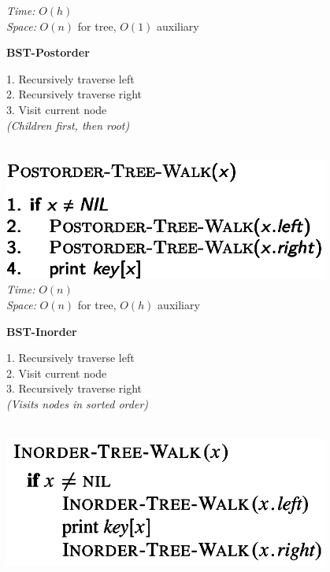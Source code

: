 {\begin{minipage}[t]{1\textwidth}
\begin{minipage}[t]{0.19\textwidth}
        \textit{Time:} \(O(h)\)\\
        \textit{Space:} \(O(n)\) for tree, \(O(1)\) auxiliary
    \end{minipage}
    \hfill
    \begin{minipage}[t]{0.19\textwidth}
        \centering
        \textbf{\scriptsize BST-Postorder}\\[2pt]
       \tiny
        \begin{minipage}[t]{\textwidth}
           \tiny
            1. Recursively traverse left\\
            2. Recursively traverse right\\
            3. Visit current node\\
            \textit{(Children first, then root)}
        \end{minipage}\\[4pt]
        \includegraphics[width=0.8\textwidth]{images/bst-postorder.png}\\[2pt]
        \textit{Time:} \(O(n)\)\\
        \textit{Space:} \(O(n)\) for tree, \(O(h)\) auxiliary
    \end{minipage}
    \hfill
    \begin{minipage}[t]{0.19\textwidth}
        \centering
        \textbf{\scriptsize BST-Inorder}\\[2pt]
       \tiny
        \begin{minipage}[t]{\textwidth}
           \tiny
            1. Recursively traverse left\\
            2. Visit current node\\
            3. Recursively traverse right\\
            \textit{(Visits nodes in sorted order)}
        \end{minipage}\\[4pt]
        \includegraphics[width=0.8\textwidth]{images/bst-inorder.png}\\[2pt]

\end{minipage}
\end{minipage}}
